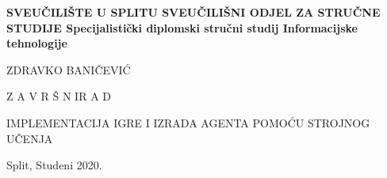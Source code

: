 %
%
\begin{titlepage}
	\bfseries
	\headerdata
	{SVEUČILIŠTE U SPLITU}
	{SVEUČILIŠNI ODJEL ZA STRUČNE STUDIJE}
	{Specijalistički diplomski stručni studij Informacijske tehnologije}
	
	\vspace*{6cm}
	\begin{center}
		{\Large ZDRAVKO BANIČEVIĆ}
		
		\vspace*{1cm}
		
		{\LARGE {Z A V R Š N I\space\space\space R A D}}
		
		\vspace*{1cm}
		\Large IMPLEMENTACIJA IGRE I IZRADA AGENTA POMOĆU STROJNOG UČENJA\\[1cm]
	
	\end{center}
	\begin{center}
		\vfill
		{\large\normalfont Split, Studeni 2020.}
	\end{center}
\end{titlepage}
%
%